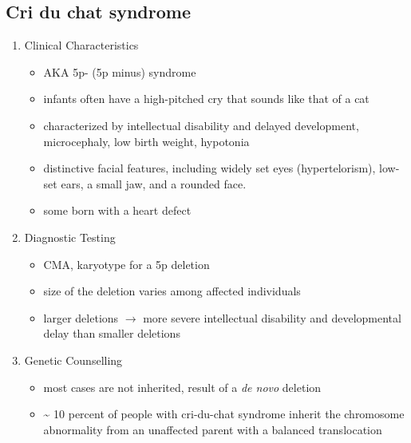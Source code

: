 \documentclass[12pt]{scrartcl}
\begin{document}
\subsection{Cri du chat syndrome}
\label{sec:org34a8edf}
\begin{enumerate}
\item Clinical Characteristics
\label{sec:org41d804a}
\begin{itemize}
\item AKA 5p- (5p minus) syndrome
\item infants often have a high-pitched cry that sounds like that of a
cat
\item characterized by intellectual disability and delayed development,
microcephaly, low birth weight, hypotonia
\item distinctive facial features, including widely set eyes
(hypertelorism), low-set ears, a small jaw, and a rounded face.
\item some born with a heart defect
\end{itemize}

\item Diagnostic Testing
\label{sec:org2e0bc70}
\begin{itemize}
\item CMA, karyotype for a 5p deletion
\item size of the deletion varies among affected individuals
\item larger deletions \(\to\) more severe intellectual disability and
developmental delay than smaller deletions
\end{itemize}

\item Genetic Counselling
\label{sec:org92b9e31}
\begin{itemize}
\item most cases are not inherited, result of a \emph{de novo} deletion
\item \textasciitilde{} 10 percent of people with cri-du-chat syndrome inherit the
chromosome abnormality from an unaffected parent with a balanced translocation
\end{itemize}
\end{enumerate}
\end{document}
